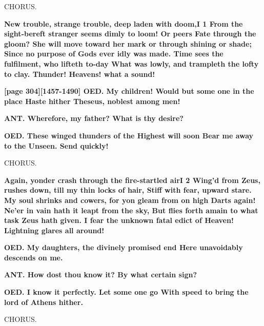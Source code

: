 \documentclass[11pt,letter]{book}
\begin{document}
\par  CHORUS.

\par \textbf{New trouble, strange trouble, deep laden with doom,I 1 From the sight-bereft stranger seems dimly to loom! Or peers Fate through the gloom? She will move toward her mark or through shining or shade; Since no purpose of Gods ever idly was made. Time sees the fulfilment, who lifteth to-day What was lowly, and trampleth the lofty to clay. Thunder! Heavens! what a sound!}
\par 

\par \textbf{[page 304][1457-1490] OED. My children! Would but some one in the place Haste hither Theseus, noblest among men!}
\par 

\par \textbf{ANT. Wherefore, my father? What is thy desire?}
\par 

\par \textbf{OED. These winged thunders of the Highest will soon Bear me away to the Unseen. Send quickly!}
\par 

\par  CHORUS.

\par \textbf{Again, yonder crash through the fire-startled airI 2 Wing’d from Zeus, rushes down, till my thin locks of hair, Stiff with fear, upward stare. My soul shrinks and cowers, for yon gleam from on high Darts again! Ne’er in vain hath it leapt from the sky, But flies forth amain to what task Zeus hath given. I fear the unknown fatal edict of Heaven! Lightning glares all around!}
\par 

\par \textbf{OED. My daughters, the divinely promised end Here unavoidably descends on me.}
\par 

\par \textbf{ANT. How dost thou know it? By what certain sign?}
\par 

\par \textbf{OED. I know it perfectly. Let some one go With speed to bring the lord of Athens hither.}
\par 

\par  CHORUS.
\end{document}
